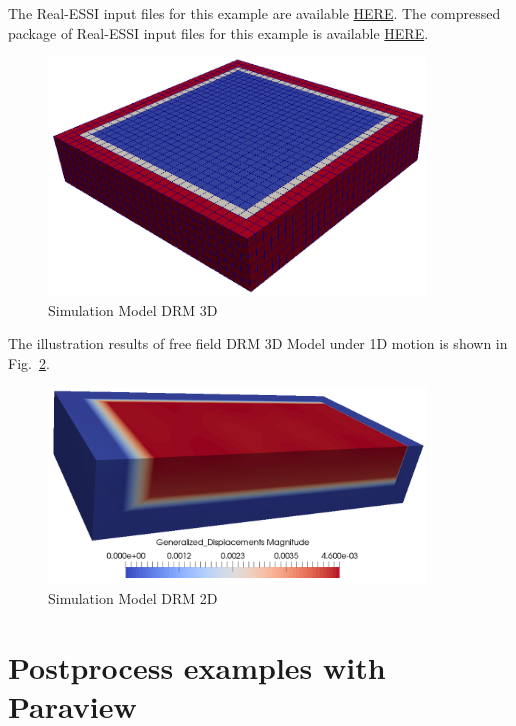 The Real-ESSI input files for this example are available 
\href{http://cml01.engr.ucdavis.edu/shortCourse/Day1/Preprocess_examples_with_Gmsh/DRM3D}{HERE}. 
The compressed package of Real-ESSI input files for this example is available 
\href{http://cml01.engr.ucdavis.edu/shortCourse/Day1/Preprocess_examples_with_Gmsh/DRM3D/DRM3D.tgz}{HERE}. 

\begin{figure}[H]
  \centering
  \includegraphics[width = 10cm]{./Figure-files/Day1/Preprocess_examples_with_Gmsh/example4/overview.png}
  \caption{Simulation Model DRM 3D}
  \label{fig_gmsh_ex4}
\end{figure}

The illustration results of free field DRM 3D Model under 1D motion is shown 
in Fig.~\ref{fig_day1_DRM3D_results}. 

\begin{figure}[H]
  \centering
  \includegraphics[width = 10cm]{./Figure-files/Day1/Preprocess_examples_with_Gmsh/example4/DRM3D_results.png}
  \caption{Simulation Model DRM 2D}
  \label{fig_day1_DRM3D_results}
\end{figure}


\clearpage
\newpage
\section{Postprocess examples with Paraview}
\label{Postprocess_examples_with_Paraview}
